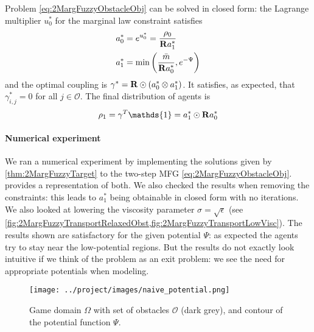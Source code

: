 \documentclass[../report.tex]{subfiles}
\begin{document}
\begin{prop}\label{thm:2MargFuzzyTarget}
Problem \eqref{eq:2MargFuzzyObstacleObj} can be solved in closed form: the Lagrange multiplier $u_0^*$ for the marginal law constraint satisfies
\begin{align*}
	a_0^* &= e^{u_0^*}  = \frac{\rho_0}{\mathbf{R} a^*_1}  \\
	a_1^* &= \min\left(\frac{\bar{m}}{\mathbf{R} a_0^*}, e^{-\Psi}\right)
\end{align*}
and the optimal coupling is $\gamma^* = \mathbf{R}\odot (a_0^* \otimes a_1^*)$.
It satisfies, as expected, that $\gamma^*_{i,j} = 0$ for all $j\in\mathscr{O}$. The final distribution of agents is
\[
	\rho_1 = \gamma^T\mathds{1} = a_1^* \odot \bfR a_0^*
\]
\end{prop}

 
\paragraph{Numerical experiment} We ran a numerical experiment by implementing the solutions given by \cref{thm:2MargFuzzyTarget} to the two-step MFG \eqref{eq:2MargFuzzyObstacleObj}.  provides a representation of both. We also checked the results when removing the constraints: this leads to $a^*_1$ being obtainable in closed form with no iterations. We also looked at lowering the viscosity parameter $\sigma = \sqrt{\epsilon}$ (see \cref{fig:2MargFuzzyTransportRelaxedObst,fig:2MargFuzzyTransportLowVisc}). The results shown are satisfactory for the given potential $\Psi$: as expected the agents try to stay near the low-potential regions. But the results do not exactly look intuitive if we think of the problem as an exit problem: we see the need for appropriate potentials when modeling.

\begin{figure}[h]
	\centering
	\texttt{[image: ../project/images/naive\_potential.png]}
	\caption{Game domain $\Omega$ with set of obstacles $\mathscr{O}$ (dark grey), and contour of the potential function $\Psi$.} \label{fig:CrowdExamplePotential}	
\end{figure}
\end{document}
